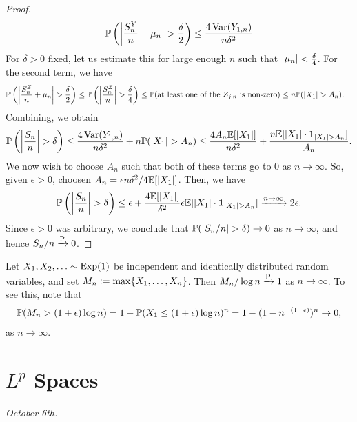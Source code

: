 \begin{proof}
\begin{align}
        \mathbb{P}\left(\left| \frac{S_{n}^{Y}}{n} - \mu_{n} \right| > \frac{\delta}{2} \right) \leq \frac{4\operatorname{Var}(Y_{1,n})}{n\delta^{2}}
    \end{align}
    For $\delta > 0$ fixed, let us estimate this for large enough $n$ such that $\left| \mu_{n} \right| < \frac{\delta}{4}$. For the second term, we have
    \begin{align}
        \mathbb{P}\left(\left| \frac{S_{n}^{Z}}{n} + \mu_{n} \right| > \frac{\delta}{2} \right) &\leq \mathbb{P}\left(\left| \frac{S_{n}^{Z}}{n} \right| > \frac{\delta}{4} \right) \leq \mathbb{P}(\text{at least one of the } Z_{j,n} \text{ is non-zero}) \leq n \mathbb{P}(\left| X_{1} \right| > A_{n}).
    \end{align}
    Combining, we obtain
    \begin{align}
        \mathbb{P}\left(\left| \frac{S_{n}}{n} \right| > \delta \right) \leq \frac{4\operatorname{Var}(Y_{1,n})}{n\delta^{2}} + n \mathbb{P}(\left| X_{1} \right| > A_{n}) \leq \frac{4 A_{n} \mathbb{E}[\left| X_{1} \right|]}{n\delta^{2}} + \frac{n\mathbb{E}[\left| X_{1} \right| \cdot \textbf{1}_{\left| X_{1} \right| > A_{n}}]}{A_{n}}.
    \end{align}
    We now wish to choose $A_{n}$ such that both of these terms go to $0$ as $n \to \infty$. So, given $\epsilon > 0$, choosen $A_{n} = \epsilon n \delta^{2}/4\mathbb{E}[\left| X_{1} \right|]$. Then, we have
    \begin{align}
        \mathbb{P}\left(\left| \frac{S_{n}}{n} \right| > \delta \right) \leq \epsilon + \frac{4\mathbb{E}[\left| X_{1} \right|]}{\delta^{2}} \epsilon \mathbb{E}[\left| X_{1} \right| \cdot \textbf{1}_{\left| X_{1} \right| > A_{n}}] \xrightarrow{n \to \infty} 2\epsilon.
    \end{align}
    Since $\epsilon > 0$ was arbitrary, we conclude that $\mathbb{P}(\left| S_{n}/n \right| > \delta) \to 0$ as $n \to \infty$, and hence $S_{n}/n \xrightarrow{\operatorname{P}} 0$.
\end{proof}

\begin{example}
    Let $X_{1},X_{2},\ldots \sim \operatorname{Exp}(1)$ be independent and identically distributed random variables, and set $M_{n} \vcentcolon= \max\{X_{1},\ldots,X_{n}\}$. Then $M_{n}/\log n \xrightarrow{\operatorname{P}} 1$ as $n \to \infty$. To see this, note that
    \begin{align}
        \mathbb{P}(M_{n} > (1+\epsilon)\log n) = 1 - \mathbb{P}(X_{1} \leq (1+\epsilon)\log n)^{n} = 1 - (1-n^{-(1+\epsilon)})^{n} \to 0,
    \end{align}
    as $n \to \infty$.
\end{example}


\section{$L^{p}$ Spaces}
\textit{October 6th.}

